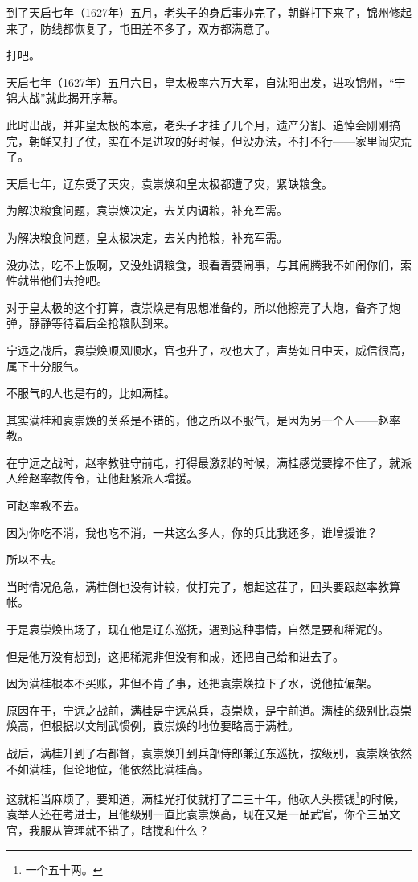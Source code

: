 \begin{multicols}{\theparacolNo}
到了天启七年（1627年）五月，老头子的身后事办完了，朝鲜打下来了，锦州修起来了，防线都恢复了，屯田差不多了，双方都满意了。

打吧。

天启七年（1627年）五月六日，皇太极率六万大军，自沈阳出发，进攻锦州，“宁锦大战”就此揭开序幕。

此时出战，并非皇太极的本意，老头子才挂了几个月，遗产分割、追悼会刚刚搞完，朝鲜又打了仗，实在不是进攻的好时候，但没办法，不打不行——家里闹灾荒了。

天启七年，辽东受了天灾，袁崇焕和皇太极都遭了灾，紧缺粮食。

为解决粮食问题，袁崇焕决定，去关内调粮，补充军需。

为解决粮食问题，皇太极决定，去关内抢粮，补充军需。

没办法，吃不上饭啊，又没处调粮食，眼看着要闹事，与其闹腾我不如闹你们，索性就带他们去抢吧。

对于皇太极的这个打算，袁崇焕是有思想准备的，所以他擦亮了大炮，备齐了炮弹，静静等待着后金抢粮队到来。

宁远之战后，袁崇焕顺风顺水，官也升了，权也大了，声势如日中天，威信很高，属下十分服气。

不服气的人也是有的，比如满桂。

其实满桂和袁崇焕的关系是不错的，他之所以不服气，是因为另一个人——赵率教。

在宁远之战时，赵率教驻守前屯，打得最激烈的时候，满桂感觉要撑不住了，就派人给赵率教传令，让他赶紧派人增援。

可赵率教不去。

因为你吃不消，我也吃不消，一共这么多人，你的兵比我还多，谁增援谁？

所以不去。

当时情况危急，满桂倒也没有计较，仗打完了，想起这茬了，回头要跟赵率教算帐。

于是袁崇焕出场了，现在他是辽东巡抚，遇到这种事情，自然是要和稀泥的。

但是他万没有想到，这把稀泥非但没有和成，还把自己给和进去了。

因为满桂根本不买账，非但不肯了事，还把袁崇焕拉下了水，说他拉偏架。

原因在于，宁远之战前，满桂是宁远总兵，袁崇焕，是宁前道。满桂的级别比袁崇焕高，但根据以文制武惯例，袁崇焕的地位要略高于满桂。

战后，满桂升到了右都督，袁崇焕升到兵部侍郎兼辽东巡抚，按级别，袁崇焕依然不如满桂，但论地位，他依然比满桂高。

这就相当麻烦了，要知道，满桂光打仗就打了二三十年，他砍人头攒钱\footnote{一个五十两。}的时候，袁举人还在考进士，且他级别一直比袁崇焕高，现在又是一品武官，你个三品文官，我服从管理就不错了，瞎搅和什么？


\end{multicols}
